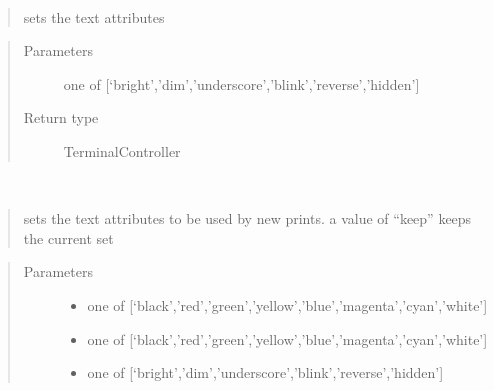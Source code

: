 \documentclass[a4paper,10pt,english]{sphinxmanual}
\begin{document}
\begin{fulllineitems}
\begin{fulllineitems}
\label{\detokenize{api/termtools.terminal.TerminalController:termtools.terminal.TerminalController.set_attribute}}~\begin{quote}

sets the text attributes
\end{quote}
\begin{quote}\begin{description}
\item[{Parameters}] \leavevmode
{} \textendash{} one of {[}‘bright’,’dim’,’underscore’,’blink’,’reverse’,’hidden’{]}

\item[{Return type}] \leavevmode
TerminalController

\end{description}\end{quote}

\end{fulllineitems}


\begin{fulllineitems}
\label{\detokenize{api/termtools.terminal.TerminalController:termtools.terminal.TerminalController.set_attributes}}~\begin{quote}

sets the text attributes to be used by new prints. a value of “keep” keeps the current set
\end{quote}
\begin{quote}\begin{description}
\item[{Parameters}] \leavevmode\begin{itemize}
\item {} 
 \textendash{} one of {[}‘black’,’red’,’green’,’yellow’,’blue’,’magenta’,’cyan’,’white’{]}

\item {} 
 \textendash{} one of {[}‘black’,’red’,’green’,’yellow’,’blue’,’magenta’,’cyan’,’white’{]}

\item {} 
 \textendash{} one of {[}‘bright’,’dim’,’underscore’,’blink’,’reverse’,’hidden’{]}


\end{itemize}
\end{description}
\end{quote}
\end{fulllineitems}
\end{fulllineitems}
\end{document}
